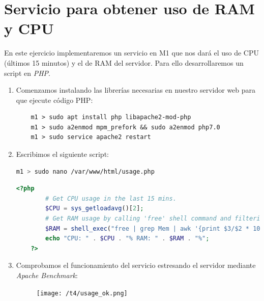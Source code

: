 \documentclass[12pt,spanish]{article}
\begin{document}
\section{Servicio para obtener uso de RAM y CPU}
En este ejercicio implementaremos un servicio en M1 que nos dará el uso de CPU (últimos 15 minutos) y el de RAM del servidor. Para ello desarrollaremos un script en \emph{PHP}.
\begin{enumerate}
	\item Comenzamos instalando las librerías necesarias en nuestro servidor web para que ejecute código PHP:
	\begin{lstlisting}
	m1 > sudo apt install php libapache2-mod-php
	m1 > sudo a2enmod mpm_prefork && sudo a2enmod php7.0
	m1 > sudo service apache2 restart
	\end{lstlisting}
	\item Escribimos el siguiente script:
	\begin{lstlisting}[language=bash]
	m1 > sudo nano /var/www/html/usage.php
	\end{lstlisting}
	\begin{lstlisting}[language=php, keywordstyle=\color{dkblue}, commentstyle=\color{gray}, stringstyle=\color{red}, identifierstyle=\color{dkgreen}]
	<?php
		# Get CPU usage in the last 15 mins.
		$CPU = sys_getloadavg()[2];
		# Get RAM usage by calling 'free' shell command and filtering.
		$RAM = shell_exec("free | grep Mem | awk '{print $3/$2 * 100.0}'");
		echo "CPU: " . $CPU . "% RAM: " . $RAM . "%";
	?>
	\end{lstlisting}
	\item Comprobamos el funcionamiento del servicio estresando el servidor mediante \emph{Apache Benchmark}:
	\begin{figure}[H]
		\centering
		\texttt{[image: /t4/usage\_ok.png]}
	\end{figure}
\end{enumerate}
\end{document}
